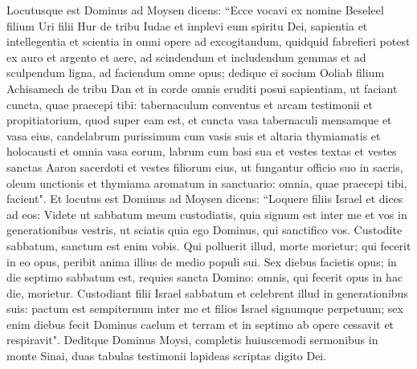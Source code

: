 \begin{biblechapter}  
\verse Locutusque est Dominus ad Moysen dicens: 
\verse “Ecce vocavi ex nomine Beseleel filium Uri filii Hur de tribu Iudae 
\verse et implevi eum spiritu Dei, sapientia et intellegentia et scientia in omni opere 
\verse ad excogitandum, quidquid fabrefieri potest ex auro et argento et aere, 
\verse ad scindendum et includendum gemmas et ad sculpendum ligna, ad faciendum omne opus; 
\verse dedique ei socium Ooliab filium Achisamech de tribu Dan et in corde omnis eruditi posui sapientiam, ut faciant cuncta, quae praecepi tibi: 
\verse tabernaculum conventus et arcam testimonii et propitiatorium, quod super eam est, et cuncta vasa tabernaculi 
\verse mensamque et vasa eius, candelabrum purissimum cum vasis suis et altaria thymiamatis 
\verse et holocausti et omnia vasa eorum, labrum cum basi sua 
\verse et vestes textas et vestes sanctas Aaron sacerdoti et vestes filiorum eius, ut fungantur officio suo in sacris, 
\verse oleum unctionis et thymiama aromatum in sanctuario: omnia, quae praecepi tibi, facient". 
\verse Et locutus est Dominus ad Moysen dicens: 
\verse “Loquere filiis Israel et dices ad eos: Videte ut sabbatum meum custodiatis, quia signum est inter me et vos in generationibus vestris, ut sciatis quia ego Dominus, qui sanctifico vos. 
\verse Custodite sabbatum, sanctum est enim vobis. Qui polluerit illud, morte morietur; qui fecerit in eo opus, peribit anima illius de medio populi sui.  
\verse Sex diebus facietis opus; in die septimo sabbatum est, requies sancta Domino: omnis, qui fecerit opus in hac die, morietur. 
\verse Custodiant filii Israel sabbatum et celebrent illud in generationibus suis: pactum est sempiternum  
\verse inter me et filios Israel signumque perpetuum; sex enim diebus fecit Dominus caelum et terram et in septimo ab opere cessavit et respiravit". 
\verse Deditque Dominus Moysi, completis huiuscemodi sermonibus in monte Sinai, duas tabulas testimonii lapideas scriptas digito Dei. 
\end{biblechapter}

